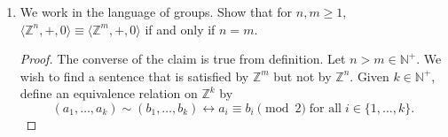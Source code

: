 \documentclass{article}
\begin{document}
\begin{enumerate}[label={\bf Q\arabic*:}]
\begin{enumerate}
\begin{proof}
          For all three cases, for each $n\in\mathbb{N}$, let $\varphi$ map
          the interval $[c_n,c_{n+1})$ in $\mathcal{M}$ linearly to
          $[c_n,c_{n+1})$ in $\mathcal{M}_i$. Also, let $\varphi$ map
          $(-\infty,c_0]$ in $\mathcal{M}$ to $(-\infty,c_0]$ in
          $\mathcal{M}_i$ by translation. Then for case (1), it is routine
          to check that $\varphi$ defines an isomorphism between
          $\mathcal{M}$ and $\mathcal{M}_1$. For case (2), we complete the
          map by sending $[\lim_{n\in\mathbb{N}}c_n,\infty)$ in
          $\mathcal{M}$ to $[\lim_{n\in\mathbb{N}}c_n,\infty)$ in
          $\mathcal{M}_2$ translation. Finally for case (3), we complete
          the map by sending $(\lim_{n\in\mathbb{N}}c_n,\infty)$ in
          $\mathcal{M}$ to $(\lim_{n\in\mathbb{N}}c_n,\infty)$ in
          $\mathcal{M}_2$ by translation. It is routine to show that
          $\varphi$ also defines an isomorphism between $\mathcal{M}$ and
          $\mathcal{M}_i$ for cases $i=2$ or $3$.
        \end{proof}
    \end{enumerate}

  \item We work in the language of groups. Show that for $n,m\geq1$,
    $\langle\mathbb{Z}^n,+,0\rangle\equiv\langle\mathbb{Z}^m,+,0\rangle$ if
    and only if $n=m$.

    \begin{proof}
      The converse of the claim is true from definition. Let
      $n>m\in\mathbb{N}^+$. We wish to find a sentence that is satisfied by
      $\mathbb{Z}^m$ but not by $\mathbb{Z}^n$. Given $k\in\mathbb{N}^+$,
      define an equivalence relation on $\mathbb{Z}^k$ by
      \begin{equation*}
        (a_1,\ldots,a_k)\sim(b_1,\ldots,b_k) \leftrightarrow a_i\equiv
        b_i\pmod{2}\; \text{for all}\; i\in\{1,\ldots,k\}.
      \end{equation*}


\end{proof}
\end{enumerate}
\end{document}
